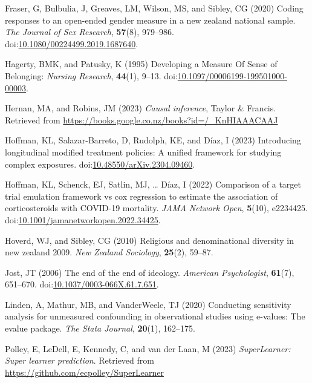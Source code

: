 \documentclass[
  singlecolumn]{article}
\newlength{\cslhangindent}
\newenvironment{CSLReferences}[2] %
 {\begin{list}{}{%
  \setlength{\itemindent}{0pt}
  \setlength{\leftmargin}{0pt}
  \setlength{\parsep}{0pt}
  \ifodd #1
   \setlength{\leftmargin}{\cslhangindent}
   \setlength{\itemindent}{-1\cslhangindent}
  \fi
  \setlength{\itemsep}{#2\baselineskip}}}
 {\end{list}}
\begin{document}
\begin{CSLReferences}{1}{0}
Fraser, G, Bulbulia, J, Greaves, LM, Wilson, MS, and Sibley, CG (2020)
Coding responses to an open-ended gender measure in a new zealand
national sample. \emph{The Journal of Sex Research}, \textbf{57}(8),
979--986.
doi:\href{https://doi.org/10.1080/00224499.2019.1687640}{10.1080/00224499.2019.1687640}.

Hagerty, BMK, and Patusky, K (1995) Developing a Measure Of Sense of
Belonging: \emph{Nursing Research}, \textbf{44}(1), 9--13.
doi:\href{https://doi.org/10.1097/00006199-199501000-00003}{10.1097/00006199-199501000-00003}.

Hernan, MA, and Robins, JM (2023) \emph{Causal inference}, Taylor \&
Francis. Retrieved from
\url{https://books.google.co.nz/books?id=/_KnHIAAACAAJ}

Hoffman, KL, Salazar-Barreto, D, Rudolph, KE, and Díaz, I (2023)
Introducing longitudinal modified treatment policies: A unified
framework for studying complex exposures.
doi:\href{https://doi.org/10.48550/arXiv.2304.09460}{10.48550/arXiv.2304.09460}.

Hoffman, KL, Schenck, EJ, Satlin, MJ, \ldots{} Díaz, I (2022) Comparison
of a target trial emulation framework vs cox regression to estimate the
association of corticosteroids with COVID-19 mortality. \emph{JAMA
Network Open}, \textbf{5}(10), e2234425.
doi:\href{https://doi.org/10.1001/jamanetworkopen.2022.34425}{10.1001/jamanetworkopen.2022.34425}.

Hoverd, WJ, and Sibley, CG (2010) Religious and denominational diversity
in new zealand 2009. \emph{New Zealand Sociology}, \textbf{25}(2),
59--87.

Jost, JT (2006) The end of the end of ideology. \emph{American
Psychologist}, \textbf{61}(7), 651--670.
doi:\href{https://doi.org/10.1037/0003-066X.61.7.651}{10.1037/0003-066X.61.7.651}.

Linden, A, Mathur, MB, and VanderWeele, TJ (2020) Conducting sensitivity
analysis for unmeasured confounding in observational studies using
e-values: The evalue package. \emph{The Stata Journal}, \textbf{20}(1),
162--175.

Polley, E, LeDell, E, Kennedy, C, and van der Laan, M (2023)
\emph{SuperLearner: Super learner prediction}. Retrieved from
\url{https://github.com/ecpolley/SuperLearner}


\end{CSLReferences}
\end{document}
